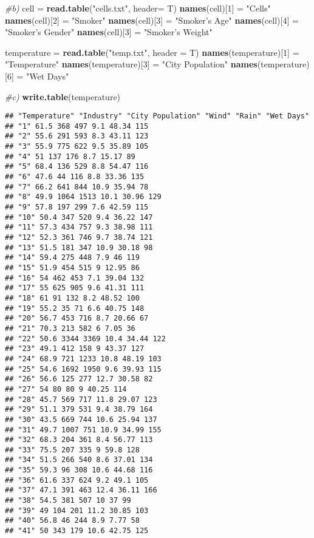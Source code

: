 \documentclass[]{article}
\newenvironment{Shaded}{\begin{snugshade}}{\end{snugshade}}
\newcommand{\CommentTok}[1]{\textcolor[rgb]{0.56,0.35,0.01}{\textit{#1}}}
\newcommand{\DataTypeTok}[1]{\textcolor[rgb]{0.13,0.29,0.53}{#1}}
\newcommand{\DecValTok}[1]{\textcolor[rgb]{0.00,0.00,0.81}{#1}}
\newcommand{\KeywordTok}[1]{\textcolor[rgb]{0.13,0.29,0.53}{\textbf{#1}}}
\newcommand{\NormalTok}[1]{#1}
\newcommand{\StringTok}[1]{\textcolor[rgb]{0.31,0.60,0.02}{#1}}
\begin{document}
\begin{Shaded}
\begin{Highlighting}[]
\CommentTok{#b)}
\NormalTok{cell =}\StringTok{ }\KeywordTok{read.table}\NormalTok{(}\StringTok{"cells.txt"}\NormalTok{, }\DataTypeTok{header=}\NormalTok{ T)}
\KeywordTok{names}\NormalTok{(cell)[}\DecValTok{1}\NormalTok{] =}\StringTok{ "Cells"}
\KeywordTok{names}\NormalTok{(cell)[}\DecValTok{2}\NormalTok{] =}\StringTok{ "Smoker"}
\KeywordTok{names}\NormalTok{(cell)[}\DecValTok{3}\NormalTok{] =}\StringTok{ "Smoker's Age"}
\KeywordTok{names}\NormalTok{(cell)[}\DecValTok{4}\NormalTok{] =}\StringTok{ "Smoker's Gender"}
\KeywordTok{names}\NormalTok{(cell)[}\DecValTok{3}\NormalTok{] =}\StringTok{ "Smoker's Weight"}

\NormalTok{temperature =}\StringTok{ }\KeywordTok{read.table}\NormalTok{(}\StringTok{"temp.txt"}\NormalTok{, }\DataTypeTok{header =}\NormalTok{ T)}
\KeywordTok{names}\NormalTok{(temperature)[}\DecValTok{1}\NormalTok{] =}\StringTok{ "Temperature"}
\KeywordTok{names}\NormalTok{(temperature)[}\DecValTok{3}\NormalTok{] =}\StringTok{ "City Population"}
\KeywordTok{names}\NormalTok{(temperature)[}\DecValTok{6}\NormalTok{] =}\StringTok{ "Wet Days"}

\CommentTok{#c)}
\KeywordTok{write.table}\NormalTok{(temperature)}
\end{Highlighting}
\end{Shaded}

\begin{verbatim}
## "Temperature" "Industry" "City Population" "Wind" "Rain" "Wet Days"
## "1" 61.5 368 497 9.1 48.34 115
## "2" 55.6 291 593 8.3 43.11 123
## "3" 55.9 775 622 9.5 35.89 105
## "4" 51 137 176 8.7 15.17 89
## "5" 68.4 136 529 8.8 54.47 116
## "6" 47.6 44 116 8.8 33.36 135
## "7" 66.2 641 844 10.9 35.94 78
## "8" 49.9 1064 1513 10.1 30.96 129
## "9" 57.8 197 299 7.6 42.59 115
## "10" 50.4 347 520 9.4 36.22 147
## "11" 57.3 434 757 9.3 38.98 111
## "12" 52.3 361 746 9.7 38.74 121
## "13" 51.5 181 347 10.9 30.18 98
## "14" 59.4 275 448 7.9 46 119
## "15" 51.9 454 515 9 12.95 86
## "16" 54 462 453 7.1 39.04 132
## "17" 55 625 905 9.6 41.31 111
## "18" 61 91 132 8.2 48.52 100
## "19" 55.2 35 71 6.6 40.75 148
## "20" 56.7 453 716 8.7 20.66 67
## "21" 70.3 213 582 6 7.05 36
## "22" 50.6 3344 3369 10.4 34.44 122
## "23" 49.1 412 158 9 43.37 127
## "24" 68.9 721 1233 10.8 48.19 103
## "25" 54.6 1692 1950 9.6 39.93 115
## "26" 56.6 125 277 12.7 30.58 82
## "27" 54 80 80 9 40.25 114
## "28" 45.7 569 717 11.8 29.07 123
## "29" 51.1 379 531 9.4 38.79 164
## "30" 43.5 669 744 10.6 25.94 137
## "31" 49.7 1007 751 10.9 34.99 155
## "32" 68.3 204 361 8.4 56.77 113
## "33" 75.5 207 335 9 59.8 128
## "34" 51.5 266 540 8.6 37.01 134
## "35" 59.3 96 308 10.6 44.68 116
## "36" 61.6 337 624 9.2 49.1 105
## "37" 47.1 391 463 12.4 36.11 166
## "38" 54.5 381 507 10 37 99
## "39" 49 104 201 11.2 30.85 103
## "40" 56.8 46 244 8.9 7.77 58
## "41" 50 343 179 10.6 42.75 125
\end{verbatim}
\end{document}
